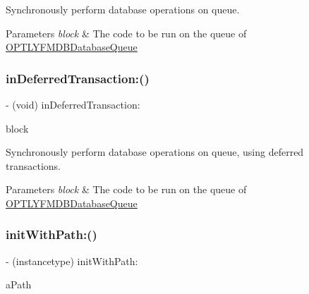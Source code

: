 Synchronously perform database operations on queue.


\begin{DoxyParams}{Parameters}
{\em block} & The code to be run on the queue of {\ttfamily \mbox{\hyperlink{interface_o_p_t_l_y_f_m_d_b_database_queue}{O\+P\+T\+L\+Y\+F\+M\+D\+B\+Database\+Queue}}} \\
\hline
\end{DoxyParams}
\mbox{\label{interface_o_p_t_l_y_f_m_d_b_database_queue_a89496d5659141d09463b0f06232a6985}} 
\subsubsection{\texorpdfstring{in\+Deferred\+Transaction\+:()}{inDeferredTransaction:()}}
{\footnotesize\ttfamily -\/ (void) in\+Deferred\+Transaction\+: \begin{DoxyParamCaption}\item[{(\+\_\+\+\_\+attribute\+\_\+\+\_\+((noescape)) void($^\wedge$)(\mbox{\hyperlink{interface_o_p_t_l_y_f_m_d_b_database}{O\+P\+T\+L\+Y\+F\+M\+D\+B\+Database}} $\ast$db, B\+O\+OL $\ast$rollback))}]{block }\end{DoxyParamCaption}}

Synchronously perform database operations on queue, using deferred transactions.


\begin{DoxyParams}{Parameters}
{\em block} & The code to be run on the queue of {\ttfamily \mbox{\hyperlink{interface_o_p_t_l_y_f_m_d_b_database_queue}{O\+P\+T\+L\+Y\+F\+M\+D\+B\+Database\+Queue}}} \\
\hline
\end{DoxyParams}
\mbox{\label{interface_o_p_t_l_y_f_m_d_b_database_queue_affaf3bb46813b9631b2dc4c8e0703e3a}} 
\subsubsection{\texorpdfstring{init\+With\+Path\+:()}{initWithPath:()}}
{\footnotesize\ttfamily -\/ (instancetype) init\+With\+Path\+: \begin{DoxyParamCaption}\item[{(N\+S\+String $\ast$\+\_\+\+Nullable)}]{a\+Path }\end{DoxyParamCaption}}

